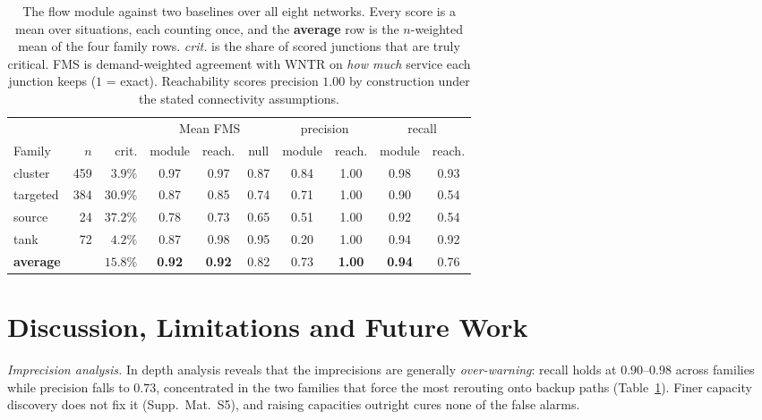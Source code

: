 \documentclass{svproc}
\begin{document}
\begin{table}[t]
\centering
\caption{The flow module against two baselines over all eight networks. Every score is a
mean over situations, each counting once, and the \textbf{average} row is the
$n$-weighted mean of the four family rows. \emph{crit.} is the share of scored
junctions that are truly critical. FMS is demand-weighted agreement with WNTR on
\emph{how much} service each junction keeps ($1$ = exact). Reachability scores
precision $1.00$ by construction under the stated connectivity assumptions.}
\label{tab:familydetect}
\setlength{\tabcolsep}{4pt}
\small
\begin{tabular}{@{}lrr@{\hskip 1.1em}ccc@{\hskip 1.1em}cc@{\hskip 1.1em}cc@{}}
\toprule
& & & \multicolumn{3}{c}{Mean FMS}
& \multicolumn{2}{c}{precision}
& \multicolumn{2}{c}{recall}\\
\cmidrule(lr){4-6}
\cmidrule(lr){7-8}
\cmidrule(lr){9-10}
Family & $n$ & crit.
& module & reach. & null
& module & reach.
& module & reach.\\
\midrule
cluster  & 459 & $3.9\%$
& 0.97 & 0.97 & 0.87
& 0.84 & 1.00
& 0.98 & 0.93\\
targeted & 384 & $30.9\%$
& 0.87 & 0.85 & 0.74
& 0.71 & 1.00
& 0.90 & 0.54\\
source   &  24 & $37.2\%$
& 0.78 & 0.73 & 0.65
& 0.51 & 1.00
& 0.92 & 0.54\\
tank     &  72 & $4.2\%$
& 0.87 & 0.98 & 0.95
& 0.20 & 1.00
& 0.94 & 0.92\\
\midrule
\textbf{average} & & $15.8\%$
& \textbf{0.92} & \textbf{0.92} & 0.82
& 0.73 & \textbf{1.00}
& \textbf{0.94} & 0.76\\
\bottomrule
\end{tabular}
\end{table}


\section{Discussion, Limitations and Future Work}\label{sec:discussion}

\emph{Imprecision analysis.} In depth analysis reveals that the imprecisions are generally \emph{over-warning}: recall holds
at $0.90$--$0.98$ across families while precision falls to $0.73$, concentrated in the
two families that force the most rerouting onto backup paths
(Table~\ref{tab:familydetect}). Finer capacity discovery does not fix it
(Supp.~Mat.~S5), and raising capacities outright cures none of the false alarms.
\end{document}
